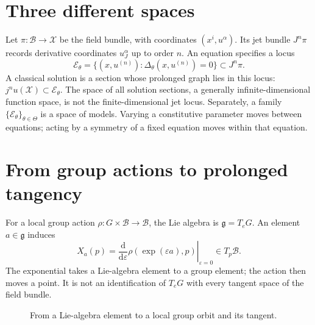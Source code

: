 \documentclass[11pt,a4paper,oneside]{report}
\numberwithin{equation}{chapter}
\newcommand{\E}{\mathcal E}
\newcommand{\dd}{\mathrm d}
\begin{document}
\section{Three different spaces}
Let $\pi:\mathcal B\to\mathcal X$ be the field bundle, with coordinates $(x^i,u^\alpha)$. Its jet bundle $J^n\pi$ records derivative coordinates $u^\alpha_J$ up to order $n$. An equation specifies a locus
\begin{equation}
\E_\theta=\{(x,u^{(n)}):\Delta_\theta(x,u^{(n)})=0\}\subset J^n\pi.
\end{equation}
A classical solution is a section whose prolonged graph lies in this locus: $j^nu(\mathcal X)\subset\E_\theta$. The space of all solution sections, a generally infinite-dimensional function space, is not the finite-dimensional jet locus. Separately, a family $\{\E_\theta\}_{\theta\in\Theta}$ is a space of models. Varying a constitutive parameter moves between equations; acting by a symmetry of a fixed equation moves within that equation.

\section{From group actions to prolonged tangency}
For a local group action $\rho:G\times\mathcal B\to\mathcal B$, the Lie algebra is $\mathfrak g=T_eG$. An element $a\in\mathfrak g$ induces
\begin{equation}
X_a(p)=\left.\frac{\dd}{\dd\varepsilon}\rho(\exp(\varepsilon a),p)\right|_{\varepsilon=0}\in T_p\mathcal B.
\end{equation}
The exponential takes a Lie-algebra element to a group element; the action then moves a point. It is not an identification of $T_eG$ with every tangent space of the field bundle.

\begin{figure}[htbp]\centering
{}
\caption{From a Lie-algebra element to a local group orbit and its tangent.}\label{fig:group}
\end{figure}
\end{document}
